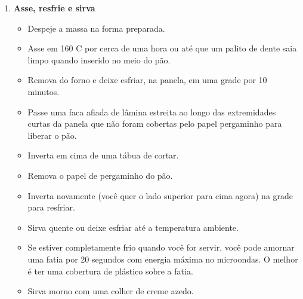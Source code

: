 \documentclass [11pt, letterpaper] {article}
\begin{document}
\begin {description}
\begin {enumerate}
\item {\bf Asse, resfrie e sirva}
\begin {itemize}
\item Despeje a massa na forma preparada.
\item Asse em 160 C por cerca de uma hora ou até que um palito de dente saia limpo quando inserido no meio do pão.
\item Remova do forno e deixe esfriar, na panela, em uma grade por 10 minutos.
\item Passe uma faca afiada de l\^amina estreita ao longo das extremidades curtas da panela que não foram cobertas pelo papel pergaminho para liberar o pão.
\item Inverta em cima de uma tábua de cortar.
\item Remova o papel de pergaminho do pão.
\item Inverta novamente (você quer o lado superior para cima agora) na grade para resfriar.
\item Sirva quente ou deixe esfriar até a temperatura ambiente.
\item Se estiver completamente frio quando você for servir, você pode amornar uma fatia por 20 segundos com energia máxima no microondas. O melhor é ter uma cobertura de plástico sobre a fatia.
\item Sirva morno com uma colher de creme azedo.
\end {itemize}

\end {enumerate}
\end {description}
\end{document}
